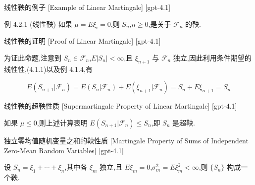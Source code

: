 \documentclass[UTF8]{ctexart}
\begin{document}
    
    
    \begin{xmp}
        {线性鞅的例子}
        [Example of Linear Martingale]
        [gpt-4.1]
        
例 4.2.1 (线性鞅) 如果 $\mu = E \xi _ { i } = 0$,则 $S _ { n }$,$n \geq 0$,是关于 ${ \mathcal { F } } _ { n }$ 的鞅.

    \end{xmp}
    
    
    
    \begin{prf}
        {线性鞅的证明}
        [Proof of Linear Martingale]
        [gpt-4.1]
        
为证此命题,注意到 $S _ { n } \in \mathcal { F } _ { n }$,$E | S _ { n } | < \infty$,且 $\xi _ { n + 1 }$ 与 ${ \mathcal { F } } _ { n }$ 独立,因此利用条件期望的线性性,(4.1.1)以及例 4.1.4,有

\[
E ( S _ { n + 1 } | { \mathcal { F } } _ { n } ) = E ( S _ { n } | { \mathcal { F } } _ { n } ) + E ( \xi _ { n + 1 } | { \mathcal { F } } _ { n } ) = S _ { n } + E \xi _ { n + 1 } = S _ { n }
\]

    \end{prf}
    
    
    
    \begin{ppt}
        {线性鞅的超鞅性质}
        [Supermartingale Property of Linear Martingale]
        [gpt-4.1]
        
如果 $\mu \leq 0$,则上述计算表明 $E ( S _ { n + 1 } | { \mathcal { F } } _ { n } ) \leq S _ { n }$,即 $S _ { n }$ 是超鞅.

    \end{ppt}
    
    
    
    \begin{thm}
        {独立零均值随机变量之和的鞅性质}
        [Martingale Property of Sums of Independent Zero-Mean Random Variables]
        [gpt-4.1]
        
设 $S_n = \xi_1 + \cdots + \xi_n$,其中各 $\xi_m$ 独立,且 $E \xi_m = 0$,$\sigma_m^2 = E \xi_m^2 < \infty$,则 $\{S_n\}$ 构成一个鞅.

    \end{thm}
    
    
    
\end{document}
